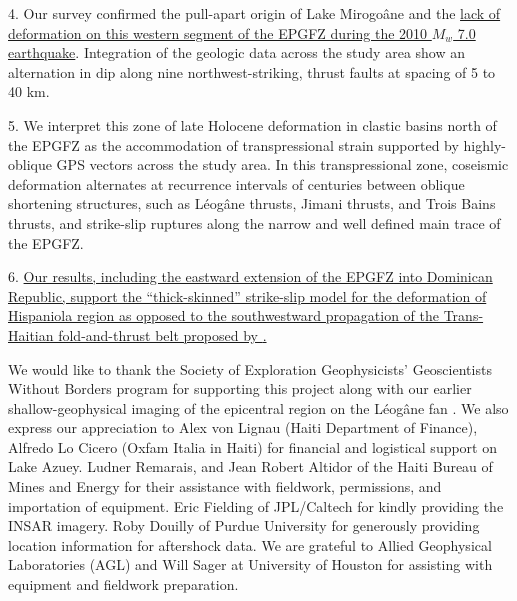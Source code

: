 \documentclass[linenumbers,draft]{agujournal}
\begin{document}
4. Our survey confirmed the pull-apart origin of Lake Mirogo\^ane and the \ul{lack of deformation on this western segment of the EPGFZ during the 2010 $M_w$ 7.0 earthquake}. Integration of the geologic data across the study area show an alternation in dip along nine northwest-striking, thrust faults at spacing of 5 to 40 km.

5.  We interpret this zone of late Holocene deformation in clastic basins north of the EPGFZ as the accommodation of transpressional strain supported by highly-oblique GPS vectors across the study area. In this transpressional zone, coseismic deformation alternates at recurrence intervals of centuries between oblique shortening structures, such as L\'eog\^ane thrusts, Jimani thrusts, and Trois Bains thrusts, and strike-slip ruptures along the narrow and well defined main trace of the EPGFZ.

6. \ul{Our results, including the eastward extension of the EPGFZ into Dominican Republic, support the ``thick-skinned'' strike-slip model for the deformation of Hispaniola region as opposed to the southwestward propagation of the Trans-Haitian fold-and-thrust belt proposed by}\underline{ \citet{pubellier2000plate}.} 
 
\acknowledgments
We would like to thank the Society of Exploration Geophysicists' Geoscientists Without Borders program for supporting this project along with our earlier shallow-geophysical imaging of the epicentral region on the L\'eog\^ane fan \citep{kocel2016near}. We also express our appreciation to Alex von Lignau (Haiti Department of Finance), Alfredo Lo Cicero (Oxfam Italia in Haiti) for financial and logistical support on Lake Azuey. Ludner Remarais, and Jean Robert Altidor of the Haiti Bureau of Mines and Energy for their assistance with fieldwork, permissions, and importation of equipment. Eric Fielding of JPL/Caltech for kindly providing the INSAR imagery. Roby Douilly of Purdue University for generously providing location information for aftershock data. We are grateful to Allied Geophysical Laboratories (AGL) and Will Sager at University of Houston for assisting with equipment and fieldwork preparation.

\clearpage


\end{document}
